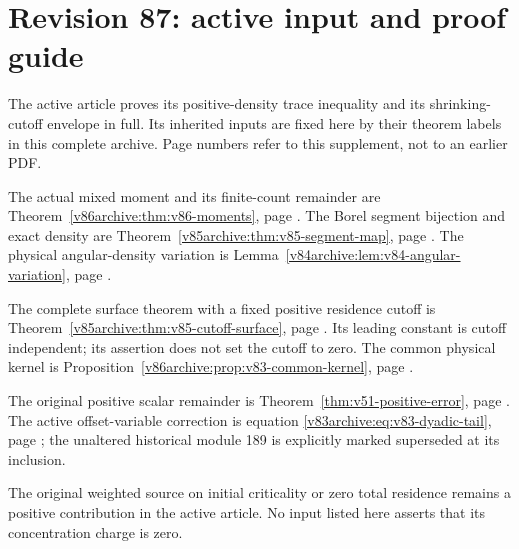 \part*{Revision 87: active input and proof guide}
The active article proves its positive-density trace inequality and its
shrinking-cutoff envelope in full. Its inherited inputs are fixed here
by their theorem labels in this complete archive. Page numbers refer to
this supplement, not to an earlier PDF.

The actual mixed moment and its finite-count remainder are
Theorem~\ref{v86archive:thm:v86-moments}, page
\pageref{v86archive:thm:v86-moments}. The Borel segment bijection and
exact density are Theorem~\ref{v85archive:thm:v85-segment-map}, page
\pageref{v85archive:thm:v85-segment-map}. The physical angular-density
variation is Lemma~\ref{v84archive:lem:v84-angular-variation}, page
\pageref{v84archive:lem:v84-angular-variation}.

The complete surface theorem with a fixed positive residence cutoff is
Theorem~\ref{v85archive:thm:v85-cutoff-surface}, page
\pageref{v85archive:thm:v85-cutoff-surface}. Its leading constant is
cutoff independent; its assertion does not set the cutoff to zero.
The common physical kernel is Proposition~\ref{v86archive:prop:v83-common-kernel},
page \pageref{v86archive:prop:v83-common-kernel}.

The original positive scalar remainder is
Theorem~\ref{thm:v51-positive-error}, page \pageref{thm:v51-positive-error}.
The active offset-variable correction is equation
\eqref{v83archive:eq:v83-dyadic-tail}, page
\pageref{v83archive:eq:v83-dyadic-tail}; the unaltered historical
module 189 is explicitly marked superseded at its inclusion.

The original weighted source on initial criticality or zero total
residence remains a positive contribution in the active article.
No input listed here asserts that its concentration charge is zero.
